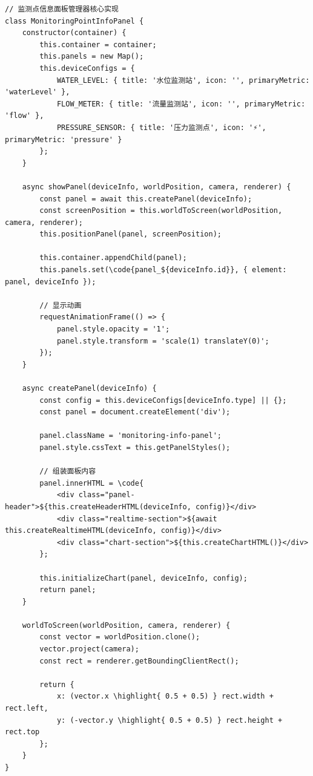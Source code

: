 \begin{lstlisting}[style=javascript]
// 监测点信息面板管理器核心实现
class MonitoringPointInfoPanel {
    constructor(container) {
        this.container = container;
        this.panels = new Map();
        this.deviceConfigs = {
            WATER_LEVEL: { title: '水位监测站', icon: '', primaryMetric: 'waterLevel' },
            FLOW_METER: { title: '流量监测站', icon: '', primaryMetric: 'flow' },
            PRESSURE_SENSOR: { title: '压力监测点', icon: '⚡', primaryMetric: 'pressure' }
        };
    }
    
    async showPanel(deviceInfo, worldPosition, camera, renderer) {
        const panel = await this.createPanel(deviceInfo);
        const screenPosition = this.worldToScreen(worldPosition, camera, renderer);
        this.positionPanel(panel, screenPosition);
        
        this.container.appendChild(panel);
        this.panels.set(\code{panel_${deviceInfo.id}}, { element: panel, deviceInfo });
        
        // 显示动画
        requestAnimationFrame(() => {
            panel.style.opacity = '1';
            panel.style.transform = 'scale(1) translateY(0)';
        });
    }
    
    async createPanel(deviceInfo) {
        const config = this.deviceConfigs[deviceInfo.type] || {};
        const panel = document.createElement('div');
        
        panel.className = 'monitoring-info-panel';
        panel.style.cssText = this.getPanelStyles();
        
        // 组装面板内容
        panel.innerHTML = \code{
            <div class="panel-header">${this.createHeaderHTML(deviceInfo, config)}</div>
            <div class="realtime-section">${await this.createRealtimeHTML(deviceInfo, config)}</div>
            <div class="chart-section">${this.createChartHTML()}</div>
        };
        
        this.initializeChart(panel, deviceInfo, config);
        return panel;
    }
    
    worldToScreen(worldPosition, camera, renderer) {
        const vector = worldPosition.clone();
        vector.project(camera);
        const rect = renderer.getBoundingClientRect();
        
        return {
            x: (vector.x \highlight{ 0.5 + 0.5) } rect.width + rect.left,
            y: (-vector.y \highlight{ 0.5 + 0.5) } rect.height + rect.top
        };
    }
}
\end{lstlisting}

